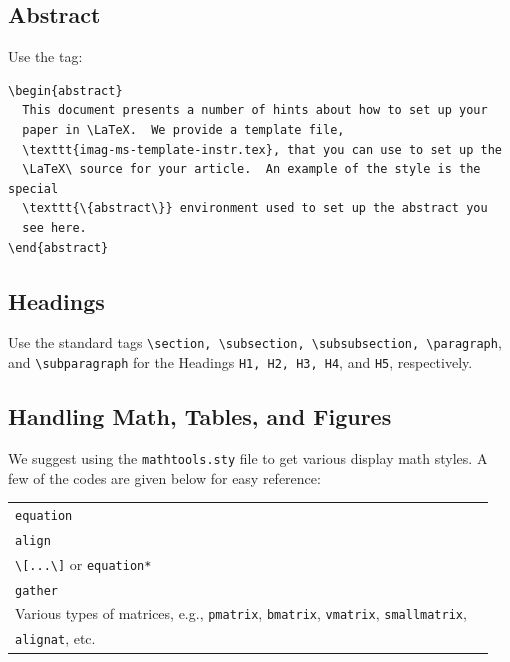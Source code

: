 \documentclass[]{imag-ms-template}
\begin{document}
\subsection{Abstract}

Use the tag:

\begin{verbatim}
\begin{abstract}
  This document presents a number of hints about how to set up your
  paper in \LaTeX.  We provide a template file,
  \texttt{imag-ms-template-instr.tex}, that you can use to set up the
  \LaTeX\ source for your article.  An example of the style is the special
  \texttt{\{abstract\}} environment used to set up the abstract you
  see here.
\end{abstract}
\end{verbatim}

\subsection{Headings}

Use the standard tags \verb!\section, \subsection, \subsubsection, \paragraph!, and \verb!\subparagraph! for the Headings \verb!H1, H2, H3, H4!, and \verb!H5!, respectively.

\subsection{Handling Math, Tables, and Figures}

We suggest using the \verb!mathtools.sty! file to get various 
display math styles. A few of the codes are given below for easy
reference:

\bigskip

\noindent\begin{tabular}{@{}ll}
\toprule
\verb!equation!\\
\verb!align!\\
\verb!\[...\]! or \verb!equation*!\\
\verb!gather!\\
Various types of matrices, e.g., \verb!pmatrix!, \verb!bmatrix!,
\verb!vmatrix!, \verb!smallmatrix!,\\
\verb!alignat!, etc.\\
\bottomrule
\end{tabular}
\end{document}

